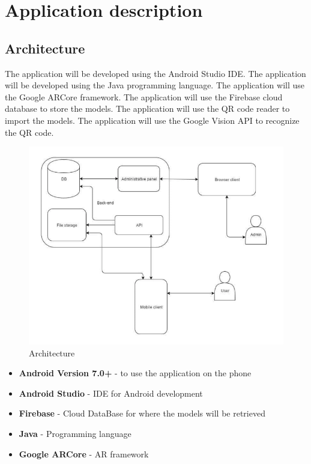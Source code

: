 \chapter{Application description}\label{chapter:appdescription}

\section{Architecture}
The application will be developed using the Android Studio IDE. The application will be developed using the Java programming language. The application will use the Google ARCore framework. The application will use the Firebase cloud database to store the models. The application will use the QR code reader to import the models. The application will use the Google Vision API to recognize the QR code.
\begin{figure}
    \begin{center}
        \includegraphics{img/architecture.png}
        \caption{Architecture}
        \label{fig:architecture}
    \end{center}
\end{figure}

\begin{itemize}
    \item \textbf{Android Version 7.0+} - to use the application on the phone
    \item \textbf{Android Studio} - IDE for Android development
    \item \textbf{Firebase} - Cloud DataBase for where the models will be retrieved
    \item \textbf{Java} - Programming language
    \item \textbf{Google ARCore} - AR framework
\end{itemize}

